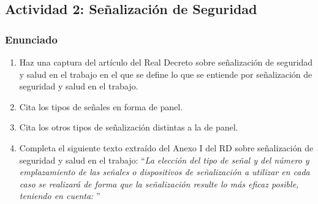 \subsection{Actividad 2: Señalización de Seguridad}

\subsubsection{Enunciado}
\begin{enumerate}[label=\alph*.]
    \item Haz una captura del artículo del Real Decreto sobre señalización de seguridad y salud en el trabajo en el que se define lo que se entiende por señalización de seguridad y salud en el trabajo.
    \item Cita los tipos de señales en forma de panel.
    \item Cita los otros tipos de señalización distintas a la de panel.
    \item Completa el siguiente texto extraído del  Anexo I del RD sobre señalización de seguridad y salud en el trabajo:
    ``\textit{La elección del tipo de señal y del número y emplazamiento de las señales o dispositivos de señalización a utilizar en cada caso se realizará de forma que la señalización resulte lo más eficaz posible, teniendo en cuenta: }''
\end{enumerate}

